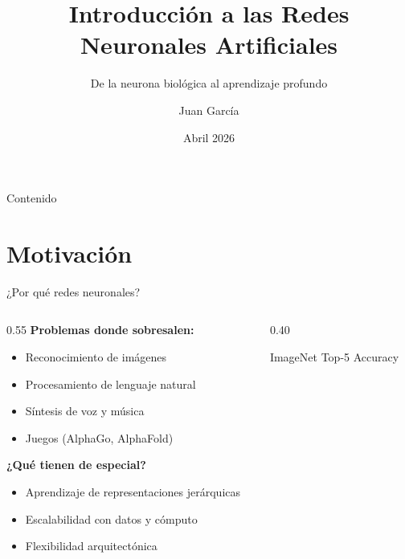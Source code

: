 \documentclass[aspectratio=169,12pt]{beamer}
\title[Redes Neuronales]{Introducción a las Redes Neuronales Artificiales}
\subtitle{De la neurona biológica al aprendizaje profundo}
\author[J. García]{Juan García}
\institute[UNAM]{Departamento de Ciencias de la Computación \\ UNAM}
\date{Abril 2026}
\begin{document}
\begin{frame}
  \titlepage
\end{frame}

\begin{frame}{Contenido}
  \tableofcontents
\end{frame}

\section{Motivación}

\begin{frame}{¿Por qué redes neuronales?}
  \begin{columns}[T]
    \begin{column}{0.55\textwidth}
      \textbf{Problemas donde sobresalen:}
      \begin{itemize}
        \item Reconocimiento de imágenes
        \item Procesamiento de lenguaje natural
        \item Síntesis de voz y música
        \item Juegos (AlphaGo, AlphaFold)
      \end{itemize}
      \vspace{0.5em}
      \textbf{¿Qué tienen de especial?}
      \begin{itemize}
        \item Aprendizaje de representaciones jerárquicas
        \item Escalabilidad con datos y cómputo
        \item Flexibilidad arquitectónica
      \end{itemize}
    \end{column}
    \hfill
    \begin{column}{0.40\textwidth}
      \centering
      \tiny ImageNet Top-5 Accuracy
    \end{column}
  \end{columns}
\end{frame}
\end{document}

